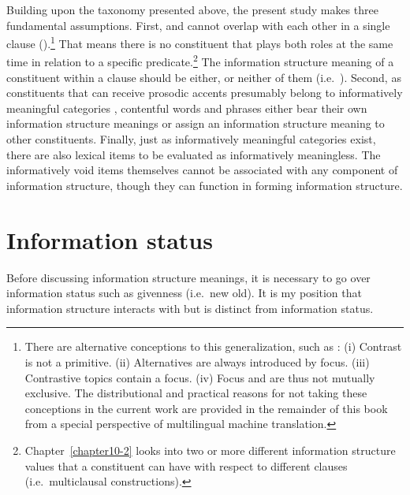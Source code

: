 Building upon the taxonomy presented above, the present study makes
three fundamental assumptions.  First,  and  cannot overlap
with each other in a single clause
(\citealt{engdahl:vallduvi:96}).\footnote{There are alternative
  conceptions to this generalization, such as \citet{krifka:08}: (i)
  Contrast is not a primitive. (ii) Alternatives are always introduced
  by focus. (iii) Contrastive topics contain a
  focus. (iv) Focus and  are thus not mutually exclusive. The
  distributional and practical reasons for not taking these
  conceptions in the current work are provided in the remainder of
  this book from a special perspective of multilingual machine
  translation.}  That means there is no constituent that plays both
roles at the same time in relation to a specific
predicate.\footnote{Chapter~\ref{chapter10-2} looks into two or more
  different information structure values that a constituent can have
  with respect to different clauses (i.e.\ multiclausal
  constructions).} The information structure meaning of a constituent
within a clause should be either, or neither of them
(i.e.\ ). Second, as constituents that can receive
prosodic accents presumably belong to informatively meaningful
categories \citep{lambrecht:96}, contentful words and phrases either
bear their own information structure meanings or assign an information
structure meaning to other constituents.  Finally, just as
informatively meaningful categories exist, there are also lexical
items to be evaluated as informatively meaningless. The informatively
void items themselves cannot be associated with any component of
information structure, though they can function in forming information
structure.




\section{Information status}
\label{3:sec:status}




Before discussing information structure meanings, it is necessary to
go over information status such as givenness (i.e.\ new \vs old). It
is my position that information structure interacts with but is
distinct from information status.


